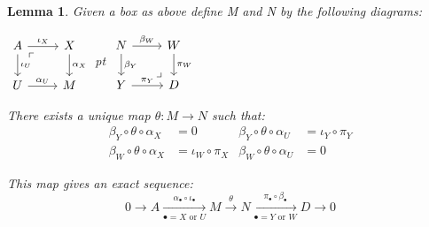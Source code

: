 \documentclass{book}
\newtheorem{lemma}[theorem]{Lemma}
\begin{document}
\begin{lemma}
Given a box as above define M and N by the following diagrams:\\
\begin{center}
 $\begin{tikzcd}
            A \arrow{r}{\iota_X} \arrow{d}{\iota_U}  \arrow[dr, phantom, "\ulcorner", very near start] & X \arrow{d}{\alpha_X} \\
	U \arrow{r}{\alpha_U} &  M
            \end{tikzcd}$
 pt 
 $\begin{tikzcd}
            N \arrow{r}{\beta_W} \arrow{d}{\beta_Y}  \arrow[dr, phantom, "\lrcorner", very near end] & W \arrow{d}{\pi_W} \\
	Y \arrow{r}{\pi_Y} &  D
            \end{tikzcd}$
\end{center}
There exists a unique map $\theta : M \to N$ such that:
\begin{align*} 
\beta_Y \circ \theta \circ \alpha_X &=0 & \beta_Y \circ \theta \circ \alpha_U &= \iota_Y \circ \pi_Y     \\
 \beta_W \circ \theta \circ \alpha_X &= \iota_W \circ \pi_X  &   \beta_W \circ \theta \circ \alpha_U &=0
\end{align*}

This map gives an exact sequence:
$$0 \rightarrow A \xrightarrow[\bullet=X \text{ or } U]{\alpha_\bullet \circ \iota_\bullet} M \xrightarrow{\theta} N \xrightarrow[\bullet=Y \text{ or } W]{\pi_\bullet \circ \beta_\bullet} D \rightarrow 0$$

\end{lemma}
\end{document}
